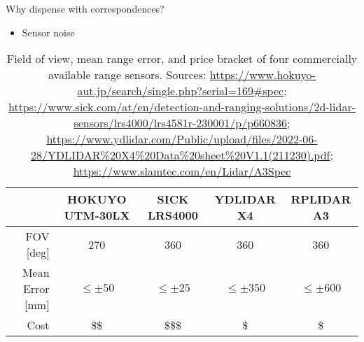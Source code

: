 \begin{frame}[noframenumbering]{Why dispense with correspondences?}

  \begin{itemize}
    \item Sensor noise
  \end{itemize}

\begin{table}[]
\begin{tabular}{r|cccc}\toprule
                      & HOKUYO UTM-30LX & SICK LRS4000  & YDLIDAR X4      & RPLIDAR A3 \\ \midrule
  FOV [deg]           & 270             & 360           & 360             & 360        \\
  Mean Error [mm]     & $\leq \pm 50$   & $\leq \pm 25$ & $\leq \pm 350$  & $\leq \pm 600$  \\
  Cost                & \$\$            & \$\$\$        & \$              & \$         \\ \bottomrule
\end{tabular}
\caption{Field of view, mean range error, and price bracket of four commercially available
         range sensors. Sources: \tiny \url{https://www.hokuyo-aut.jp/search/single.php?serial=169\#spec}; \url{https://www.sick.com/at/en/detection-and-ranging-solutions/2d-lidar-sensors/lrs4000/lrs4581r-230001/p/p660836}; \url{https://www.ydlidar.com/Public/upload/files/2022-06-28/YDLIDAR\%20X4\%20Data\%20sheet\%20V1.1(211230).pdf}; \url{https://www.slamtec.com/en/Lidar/A3Spec}}
\end{table}

\end{frame}
